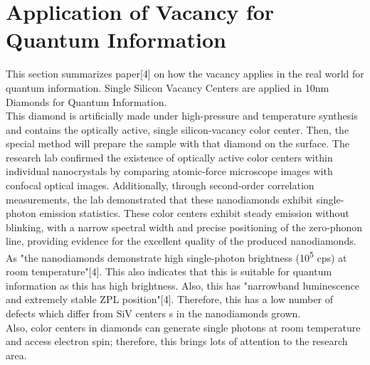 \documentclass{article}
\begin{document}
\section{Application of Vacancy for Quantum Information}
This section summarizes paper[4] on how the vacancy applies in the real world for quantum information. 
Single Silicon Vacancy Centers are applied in 10nm Diamonds for Quantum Information. \\
This diamond is artificially made under high-pressure and temperature synthesis and contains the optically active, single silicon-vacancy color center.
Then, the special method will prepare the sample with that diamond on the surface. 
The research lab confirmed the existence of optically active color centers within individual nanocrystals by comparing atomic-force microscope images with confocal optical images. 
Additionally, through second-order correlation measurements, the lab demonstrated that these nanodiamonds exhibit single-photon emission statistics. 
These color centers exhibit steady emission without blinking, with a narrow spectral width and precise positioning of the zero-phonon line, providing evidence for the excellent quality of the produced nanodiamonds.
\\
As "the nanodiamonds demonstrate high single-photon brightness (10\textsuperscript{5} cps) at room temperature"[4].
This also indicates that this is suitable for quantum information as this has high brightness. 
Also, this has "narrowband luminescence and extremely stable ZPL position"[4]. 
Therefore, this has a low number of defects which differ from SiV centers s in the nanodiamonds grown.\\

Also, color centers in diamonds can generate single photons at room temperature and access electron spin; therefore, this brings lots of attention to the research area.  
\end{document}
